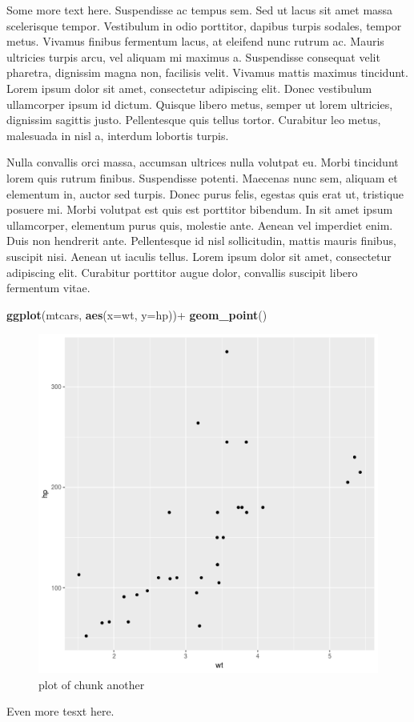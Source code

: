 \documentclass[12pt,article,oneside]{memoir}
\makeatletter
\newenvironment{Shaded}{}{}
\newcommand{\KeywordTok}[1]{\textcolor[rgb]{0.00,0.44,0.13}{\textbf{#1}}}
\newcommand{\DataTypeTok}[1]{\textcolor[rgb]{0.56,0.13,0.00}{#1}}
\newcommand{\StringTok}[1]{\textcolor[rgb]{0.25,0.44,0.63}{#1}}
\newcommand{\OperatorTok}[1]{\textcolor[rgb]{0.40,0.40,0.40}{#1}}
\newcommand{\NormalTok}[1]{#1}
\def\maxwidth{\ifdim\Gin@nat@width>\linewidth\linewidth
\else\Gin@nat@width\fi}
\let\Oldincludegraphics\includegraphics
\renewcommand{\includegraphics}[1]{\Oldincludegraphics[width=\maxwidth]{#1}}
\makeatother
\begin{document}
Some more text here. Suspendisse ac tempus sem. Sed ut lacus sit amet
massa scelerisque tempor. Vestibulum in odio porttitor, dapibus turpis
sodales, tempor metus. Vivamus finibus fermentum lacus, at eleifend nunc
rutrum ac. Mauris ultricies turpis arcu, vel aliquam mi maximus a.
Suspendisse consequat velit pharetra, dignissim magna non, facilisis
velit. Vivamus mattis maximus tincidunt. Lorem ipsum dolor sit amet,
consectetur adipiscing elit. Donec vestibulum ullamcorper ipsum id
dictum. Quisque libero metus, semper ut lorem ultricies, dignissim
sagittis justo. Pellentesque quis tellus tortor. Curabitur leo metus,
malesuada in nisl a, interdum lobortis turpis.

Nulla convallis orci massa, accumsan ultrices nulla volutpat eu. Morbi
tincidunt lorem quis rutrum finibus. Suspendisse potenti. Maecenas nunc
sem, aliquam et elementum in, auctor sed turpis. Donec purus felis,
egestas quis erat ut, tristique posuere mi. Morbi volutpat est quis est
porttitor bibendum. In sit amet ipsum ullamcorper, elementum purus quis,
molestie ante. Aenean vel imperdiet enim. Duis non hendrerit ante.
Pellentesque id nisl sollicitudin, mattis mauris finibus, suscipit nisi.
Aenean ut iaculis tellus. Lorem ipsum dolor sit amet, consectetur
adipiscing elit. Curabitur porttitor augue dolor, convallis suscipit
libero fermentum vitae.

\begin{Shaded}
\begin{Highlighting}[]
\KeywordTok{ggplot}\NormalTok{(mtcars, }\KeywordTok{aes}\NormalTok{(}\DataTypeTok{x=}\NormalTok{wt, }\DataTypeTok{y=}\NormalTok{hp))}\OperatorTok{+}\StringTok{ }\KeywordTok{geom_point}\NormalTok{()}
\end{Highlighting}
\end{Shaded}

\begin{figure}
\centering
\includegraphics{figure/another-1.png}
\caption{plot of chunk another}
\end{figure}

Even more tesxt here.
\indent
\end{document}
